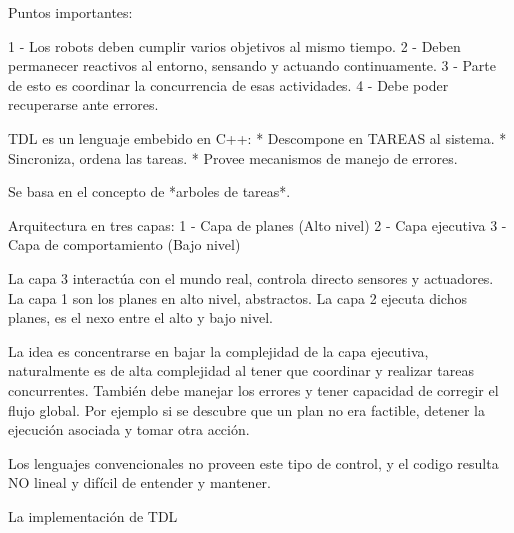 

Puntos importantes:
 
1 - Los robots deben cumplir varios objetivos al mismo tiempo.
2 - Deben permanecer reactivos al entorno, sensando y actuando continuamente.
3 - Parte de esto es coordinar la concurrencia de esas actividades.
4 - Debe poder recuperarse ante errores.

TDL es un lenguaje embebido en C++:
* Descompone en TAREAS al sistema.
* Sincroniza, ordena las tareas.
* Provee mecanismos de manejo de errores.

Se basa en el concepto de *arboles de tareas*.

Arquitectura en tres capas:
1 - Capa de planes (Alto nivel)
2 - Capa ejecutiva
3 - Capa de comportamiento (Bajo nivel)

La capa 3 interactúa con el mundo real, controla directo sensores y actuadores.
La capa 1 son los planes en alto nivel, abstractos.
La capa 2 ejecuta dichos planes, es el nexo entre el alto y bajo nivel.

La idea es concentrarse en bajar la complejidad de la capa ejecutiva,
naturalmente es de alta complejidad al tener que coordinar y realizar
tareas concurrentes.
También debe manejar los errores y tener capacidad de corregir el flujo
global. Por ejemplo si se descubre que un plan no era factible, detener
la ejecución asociada y tomar otra acción.

Los lenguajes convencionales no proveen este tipo de control, y el codigo
resulta NO lineal y difícil de entender y mantener.

La implementación de TDL
